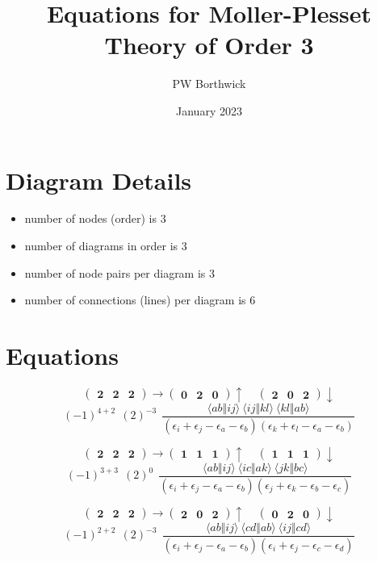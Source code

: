 \documentclass[12pt,oneside,a4paper,fleqn]{article}
\begin{document}
\title{Equations for Moller-Plesset Theory of Order 3}
\author{PW Borthwick}
\date{January 2023}
\maketitle

\section{Diagram Details}
\begin{itemize}
\item number of nodes (order) is 3
\item number of diagrams in order is 3
\item number of node pairs per diagram is 3
\item number of connections (lines) per diagram is 6
\end{itemize}

\section{Equations}
\normalsize

\[ \boldsymbol{ \begin{pmatrix} 2 & 2 & 2 \end{pmatrix} \rightarrow \begin{pmatrix} 0 & 2 & 0 \end{pmatrix} \uparrow~~~~~\begin{pmatrix} 2 & 0 & 2 \end{pmatrix} \downarrow } \]
$$(-1)^{4+2}~~(2)^{-3}~~\frac{\langle ab \Vert ij \rangle ~\langle ij \Vert kl \rangle ~\langle kl \Vert ab \rangle }{(\epsilon_i +\epsilon_j -\epsilon_a -\epsilon_b ) (\epsilon_k +\epsilon_l -\epsilon_a -\epsilon_b ) }$$

\[ \boldsymbol{ \begin{pmatrix} 2 & 2 & 2 \end{pmatrix} \rightarrow \begin{pmatrix} 1 & 1 & 1 \end{pmatrix} \uparrow~~~~~\begin{pmatrix} 1 & 1 & 1 \end{pmatrix} \downarrow } \]
$$(-1)^{3+3}~~(2)^{0}~~\frac{\langle ab \Vert ij \rangle ~\langle ic \Vert ak \rangle ~\langle jk \Vert bc \rangle }{(\epsilon_i +\epsilon_j -\epsilon_a -\epsilon_b ) (\epsilon_j +\epsilon_k -\epsilon_b -\epsilon_c ) }$$

\[ \boldsymbol{ \begin{pmatrix} 2 & 2 & 2 \end{pmatrix} \rightarrow \begin{pmatrix} 2 & 0 & 2 \end{pmatrix} \uparrow~~~~~\begin{pmatrix} 0 & 2 & 0 \end{pmatrix} \downarrow } \]
$$(-1)^{2+2}~~(2)^{-3}~~\frac{\langle ab \Vert ij \rangle ~\langle cd \Vert ab \rangle ~\langle ij \Vert cd \rangle }{(\epsilon_i +\epsilon_j -\epsilon_a -\epsilon_b ) (\epsilon_i +\epsilon_j -\epsilon_c -\epsilon_d ) }$$
\end{document}
